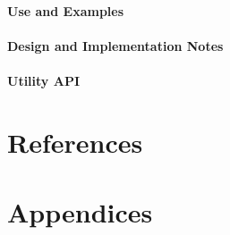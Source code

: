 \documentclass[english]{article}
\begin{document}
\subsection{Use and Examples}

%
%
\subsection{Design and Implementation Notes}

\subsection{Utility API}



%
%
\newpage
\part{References}


\newpage
\begin{htmlonly}
\end{htmlonly}
\part{Appendices}



\end{document}
